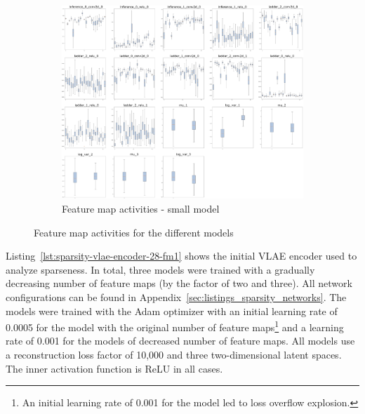 \begin{figure}
    \ContinuedFloat
    \centering
    \begin{subfigure}{.95\textwidth}
        \centering
        \includegraphics[width=\textwidth]{images/sparseness/encoder_fm3_fms.png}
        \caption{Feature map activities - small model}
    \end{subfigure}
    \caption{Feature map activities for the different models}
    \label{fig:fm_activities_sparseness}
\end{figure}

Listing~\ref{lst:sparsity-vlae-encoder-28-fm1} shows the initial \ac{VLAE} encoder used to analyze sparseness.
In total, three models were trained with a gradually decreasing number of feature maps (by the factor of two and three).
All network configurations can be found in Appendix~\ref{sec:listings_sparsity_networks}.
The models were trained with the Adam optimizer with an initial learning rate of 0.0005 for the model with the original number of feature maps\footnote{An initial learning rate of 0.001 for the  model led to loss overflow explosion.} and a learning rate of 0.001 for the models of decreased number of feature maps.
All models use a reconstruction loss factor of 10,000 and three two-dimensional latent spaces.
The inner activation function is ReLU in all cases.

